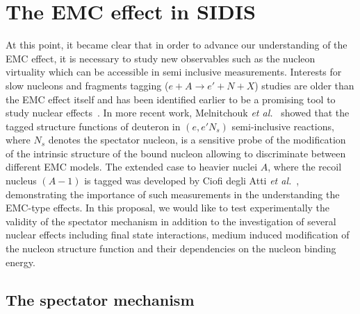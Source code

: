 
\chapter{The EMC effect in SIDIS}
\label{chap:physics}

At this point, it became clear that in order to advance our understanding of the EMC effect, it is necessary to study new observables such as the nucleon virtuality which can be accessible in semi inclusive measurements. Interests for slow nucleons and fragments tagging ($e+A \rightarrow e' + N + X$) studies are older than the EMC effect itself and has been identified earlier to be a promising tool to study nuclear effects~\cite{Frankfurt:1981mk,frankfurt1988,CiofidegliAtti:1993ep}. In more recent work, Melnitchouk {\it et al.}~\cite{Melnitchouk1997} showed that the tagged structure functions of deuteron in $(e,e'N_s)$ semi-inclusive reactions, where $N_s$ denotes the spectator nucleon, is a sensitive probe of the modification of the intrinsic structure of the bound nucleon allowing to discriminate between different EMC models. The extended case to heavier nuclei $A$, where the recoil nucleus $(A-1)$ is tagged was developed by Ciofi degli Atti {\it et al.}~\cite{CiofidegliAtti1999,CiofidelgiAtti:2007qu,Palli2009,Atti:2010yf}, demonstrating the importance of such measurements in the understanding the EMC-type effects. In this proposal, we would like to test experimentally the validity of the spectator mechanism in addition to the investigation of several nuclear effects including final state interactions, medium induced modification of the nucleon structure function and their dependencies on the nucleon binding energy.

\section{The spectator mechanism}


